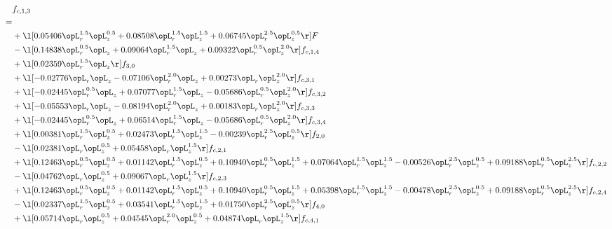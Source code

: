 \begin{alignat}{2} 
\label{eq:f_13_2} 
& f_{c,1,3} \nonumber \\ 
 = \\ 
& + \l[  0.05406 \opL_r^{1.5} \opL_z^{0.5} +  0.08508 \opL_r^{1.5} \opL_z^{1.5} +  0.06745 \opL_r^{2.5} \opL_z^{0.5}  \r] F \nonumber \\ 
& - \l[  0.14838 \opL_r^{0.5} \opL_z +  0.09064 \opL_r^{1.5} \opL_z +  0.09322 \opL_r^{0.5} \opL_z^{2.0}  \r] f_{c,1,4} \nonumber \\ 
& + \l[  0.02359 \opL_r^{1.5} \opL_z  \r] f_{3,0} \nonumber \\ 
& + \l[  -0.02776 \opL_r \opL_z   -0.07106 \opL_r^{2.0} \opL_z +  0.00273 \opL_r \opL_z^{2.0}  \r] f_{c,3,1} \nonumber \\ 
& + \l[  -0.02445 \opL_r^{0.5} \opL_z +  0.07077 \opL_r^{1.5} \opL_z   -0.05686 \opL_r^{0.5} \opL_z^{2.0}  \r] f_{c,3,2} \nonumber \\ 
& + \l[  -0.05553 \opL_r \opL_z   -0.08194 \opL_r^{2.0} \opL_z +  0.00183 \opL_r \opL_z^{2.0}  \r] f_{c,3,3} \nonumber \\ 
& + \l[  -0.02445 \opL_r^{0.5} \opL_z +  0.06514 \opL_r^{1.5} \opL_z   -0.05686 \opL_r^{0.5} \opL_z^{2.0}  \r] f_{c,3,4} \nonumber \\ 
& + \l[  0.00381 \opL_r^{1.5} \opL_z^{0.5} +  0.02473 \opL_r^{1.5} \opL_z^{1.5}   -0.00239 \opL_r^{2.5} \opL_z^{0.5}  \r] f_{2,0} \nonumber \\ 
& - \l[  0.02381 \opL_r \opL_z^{0.5} +  0.05458 \opL_r \opL_z^{1.5}  \r] f_{c,2,1} \nonumber \\ 
& + \l[  0.12463 \opL_r^{0.5} \opL_z^{0.5} +  0.01142 \opL_r^{1.5} \opL_z^{0.5} +  0.10940 \opL_r^{0.5} \opL_z^{1.5} +  0.07064 \opL_r^{1.5} \opL_z^{1.5}   -0.00526 \opL_r^{2.5} \opL_z^{0.5} +  0.09188 \opL_r^{0.5} \opL_z^{2.5}  \r] f_{c,2,2} \nonumber \\ 
& - \l[  0.04762 \opL_r \opL_z^{0.5} +  0.09067 \opL_r \opL_z^{1.5}  \r] f_{c,2,3} \nonumber \\ 
& + \l[  0.12463 \opL_r^{0.5} \opL_z^{0.5} +  0.01142 \opL_r^{1.5} \opL_z^{0.5} +  0.10940 \opL_r^{0.5} \opL_z^{1.5} +  0.05398 \opL_r^{1.5} \opL_z^{1.5}   -0.00478 \opL_r^{2.5} \opL_z^{0.5} +  0.09188 \opL_r^{0.5} \opL_z^{2.5}  \r] f_{c,2,4} \nonumber \\ 
& - \l[  0.02337 \opL_r^{1.5} \opL_z^{0.5} +  0.03541 \opL_r^{1.5} \opL_z^{1.5} +  0.01750 \opL_r^{2.5} \opL_z^{0.5}  \r] f_{4,0} \nonumber \\ 
& + \l[  0.05714 \opL_r \opL_z^{0.5} +  0.04545 \opL_r^{2.0} \opL_z^{0.5} +  0.04874 \opL_r \opL_z^{1.5}  \r] f_{c,4,1} \nonumber \\ 

\end{alignat}

